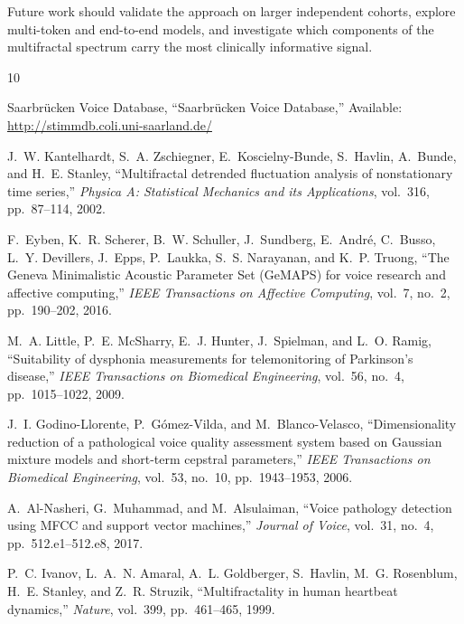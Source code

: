 \documentclass[conference]{IEEEtran}
\begin{document}
  Future work should validate the approach on larger independent cohorts, explore multi-token and end-to-end models, and investigate which components of the multifractal spectrum carry the most clinically informative signal.
  \begin{thebibliography}{10}

  Saarbrücken Voice Database, 
  ``Saarbrücken Voice Database,'' 
  Available: \url{http://stimmdb.coli.uni-saarland.de/}

  J.~W. Kantelhardt, S.~A. Zschiegner, E.~Koscielny-Bunde, 
  S.~Havlin, A.~Bunde, and H.~E. Stanley, 
  ``Multifractal detrended fluctuation analysis of nonstationary time series,'' 
  \emph{Physica A: Statistical Mechanics and its Applications}, 
  vol.~316, pp.~87--114, 2002.

  F.~Eyben, K.~R. Scherer, B.~W. Schuller, J.~Sundberg, 
  E.~André, C.~Busso, L.~Y. Devillers, J.~Epps, 
  P.~Laukka, S.~S. Narayanan, and K.~P. Truong, 
  ``The Geneva Minimalistic Acoustic Parameter Set (GeMAPS) for voice research and affective computing,'' 
  \emph{IEEE Transactions on Affective Computing}, 
  vol.~7, no.~2, pp.~190--202, 2016.

  M.~A. Little, P.~E. McSharry, E.~J. Hunter, 
  J.~Spielman, and L.~O. Ramig, 
  ``Suitability of dysphonia measurements for telemonitoring of Parkinson's disease,'' 
  \emph{IEEE Transactions on Biomedical Engineering}, 
  vol.~56, no.~4, pp.~1015--1022, 2009.

  J.~I. Godino-Llorente, P.~Gómez-Vilda, and M.~Blanco-Velasco, 
  ``Dimensionality reduction of a pathological voice quality assessment system based on Gaussian mixture models and short-term cepstral parameters,'' 
  \emph{IEEE Transactions on Biomedical Engineering}, 
  vol.~53, no.~10, pp.~1943--1953, 2006.

  A.~Al-Nasheri, G.~Muhammad, and M.~Alsulaiman, 
  ``Voice pathology detection using MFCC and support vector machines,'' 
  \emph{Journal of Voice}, 
  vol.~31, no.~4, pp.~512.e1--512.e8, 2017.

  P.~C. Ivanov, L.~A.~N. Amaral, A.~L. Goldberger, 
  S.~Havlin, M.~G. Rosenblum, H.~E. Stanley, and Z.~R. Struzik, 
  ``Multifractality in human heartbeat dynamics,'' 
  \emph{Nature}, vol.~399, pp.~461--465, 1999.


\end{thebibliography}
\end{document}

